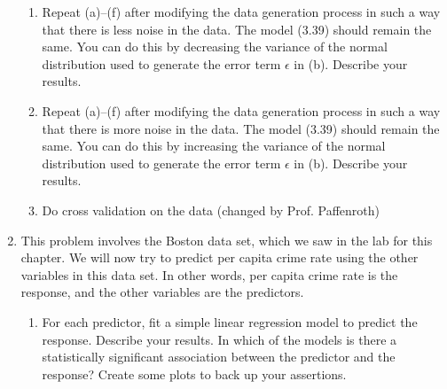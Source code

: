 \begin{enumerate}
\begin{enumerate}

    \item Repeat (a)–(f) after modifying the data generation
    process in such a way that there is less noise in the
    data. The model (3.39) should remain the same. You can do
    this by decreasing the variance of the normal distribution
    used to generate the error term $\epsilon$ in (b).
    Describe your results. \\


    \item Repeat (a)–(f) after
    modifying the data
    generation process in such
    a way that there is more
    noise in the data. The
    model (3.39) should remain
    the same. You can do this
    by increasing the variance
    of the normal distribution
    used to generate the error
    term $\epsilon$ in (b).
    Describe your results. \\


    \item
    Do
    cross
    validation
    on
    the
    data
    (changed
     by
     Prof.
     Paffenroth)
    \\


    \end{enumerate}

    \item
    This
    problem
    involves
    the
    Boston
    data
    set,
    which
    we
    saw
    in
    the
    lab
    for
    this
    chapter.
    We
    will
    now
    try
    to
    predict
    per
    capita
    crime
    rate
    using
    the
    other
    variables
    in
    this
    data
    set.
    In
    other
    words,
    per
    capita
    crime
    rate
    is
    the
    response,
    and
    the
    other
    variables
    are
    the
    predictors.
    \begin{enumerate}
    \item
    For
    each
    predictor,
    fit
    a
    simple
    linear
    regression
    model
    to
    predict
    the
    response.
    Describe
    your
    results.
    In
    which
    of
    the
    models
    is
    there
    a
    statistically
    significant
    association
    between
    the
    predictor
    and
    the
    response?
    Create
    some
    plots
    to
    back
    up
    your
    assertions.
    \\


\end{enumerate}
\end{enumerate}

